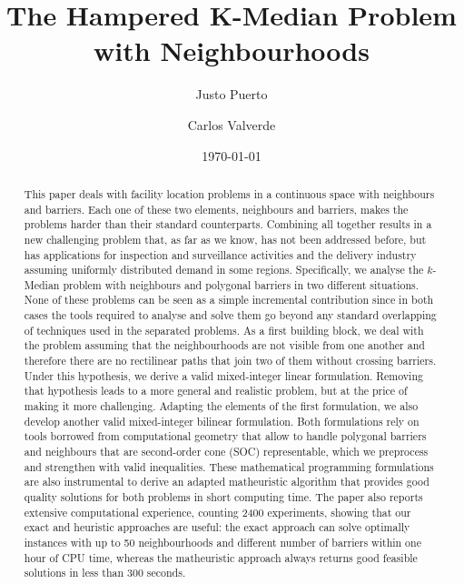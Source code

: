 \documentclass[a4paper,  review, authoryear, 1p.]{elsarticle}
\newcommand{\JP}[1]{{\color{blue}#1}}
\begin{document}
	
	\begin{frontmatter}
		
		\title{The Hampered K-Median Problem with Neighbourhoods}
		
		\author[1]{Justo Puerto}%
		\author[2]{Carlos Valverde}
		
		\address[1]{Institute of Mathematics (IMUS) and Department of Statistics and Operations Research, University of Seville, Seville, 41012, Spain}
		\address[2]{Institute of Mathematics (IMUS) and Department of Statistics and Operations Research, University of Seville, Seville, 41012, Spain}
		
		
		\date{\today}
		
		
		\begin{abstract}
			This paper deals with facility location problems in a continuous space with neighbours and barriers. Each one of these two elements, neighbours and barriers, makes the problems harder than their standard counterparts. Combining all together results in a new challenging problem that, as far as we know, has not been addressed before, but has applications for inspection and surveillance activities and the delivery industry assuming uniformly distributed demand in some regions. Specifically, we analyse the $k$-Median problem with neighbours and polygonal barriers in two different situations. \JP{None of these problems can be  seen as a simple incremental contribution since in both cases the tools required to analyse and solve them go beyond any standard overlapping of techniques used in the separated problems.} As a first building block, we deal with the problem assuming that the neighbourhoods are not visible from one another and therefore there are no rectilinear paths that join two of them without crossing barriers. Under this hypothesis, we derive a valid mixed-integer linear formulation. Removing that hypothesis leads to a more general and realistic problem, but at the price of making it more challenging. Adapting the elements of the first formulation, we also develop another valid mixed-integer bilinear formulation.  \JP{Both formulations rely on tools borrowed from computational geometry} that allow to handle polygonal barriers and neighbours that are second-order cone (SOC) representable, which we preprocess and strengthen with valid inequalities. These mathematical programming formulations are also instrumental to derive an adapted matheuristic algorithm that provides good quality solutions for both problems in short computing time. The paper also reports extensive computational experience, counting 2400 experiments, showing that our exact and heuristic approaches are useful: the exact approach can solve optimally instances with up to 50 neighbourhoods and different number of barriers within one hour of CPU time, whereas the matheuristic approach always returns good feasible solutions in less than 300 seconds.
		\end{abstract}
		

\end{frontmatter}
\end{document}
